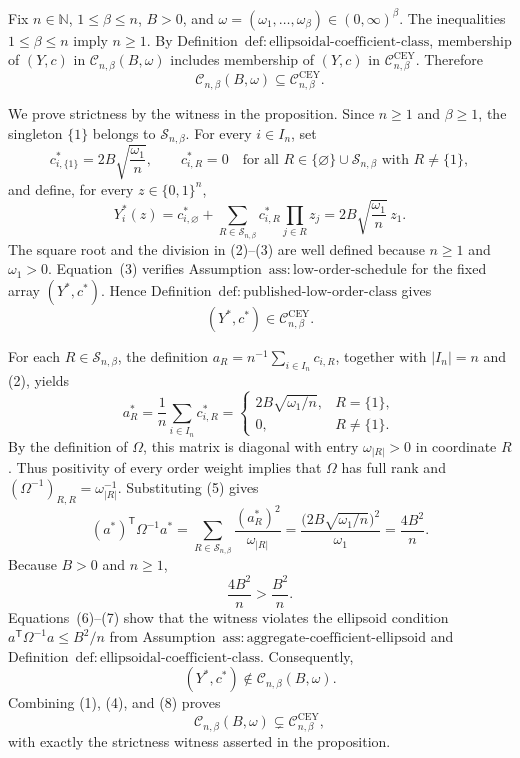 Fix \(n\in\mathbb N\), \(1\leq\beta\leq n\), \(B>0\), and
\(\omega=(\omega_1,\ldots,\omega_\beta)\in(0,\infty)^\beta\).  The inequalities
\(1\leq\beta\leq n\) imply \(n\geq1\).  By
Definition~\(\mathrm{def{:}ellipsoidal\text{-}coefficient\text{-}class}\), membership of
\((Y,c)\) in \(\mathcal C_{n,\beta}(B,\omega)\) includes membership of
\((Y,c)\) in \(\mathcal C^{\mathrm{CEY}}_{n,\beta}\).  Therefore
\[
\mathcal C_{n,\beta}(B,\omega)
\subseteq \mathcal C^{\mathrm{CEY}}_{n,\beta}.
\tag{1}
\]

We prove strictness by the witness in the proposition.  Since \(n\geq1\) and
\(\beta\geq1\), the singleton \(\{1\}\) belongs to
\(\mathcal S_{n,\beta}\).  For every \(i\in I_n\), set
\[
c^*_{i,\{1\}}=2B\sqrt{\frac{\omega_1}{n}},
\qquad
c^*_{i,R}=0
\quad
\text{for all }R\in\{\varnothing\}\cup\mathcal S_{n,\beta}
\text{ with }R\neq\{1\},
\tag{2}
\]
and define, for every \(z\in\{0,1\}^n\),
\[
Y_i^*(z)
=c^*_{i,\varnothing}
+\sum_{R\in\mathcal S_{n,\beta}}c^*_{i,R}
  \prod_{j\in R}z_j
=2B\sqrt{\frac{\omega_1}{n}}\,z_1.
\tag{3}
\]
The square root and the division in (2)--(3) are well defined because
\(n\geq1\) and \(\omega_1>0\).  Equation~(3) verifies
Assumption~\(\mathrm{ass{:}low\text{-}order\text{-}schedule}\) for the fixed array
\((Y^*,c^*)\).  Hence Definition~\(\mathrm{def{:}published\text{-}low\text{-}order\text{-}class}\)
gives
\[
(Y^*,c^*)\in\mathcal C^{\mathrm{CEY}}_{n,\beta}.
\tag{4}
\]

For each \(R\in\mathcal S_{n,\beta}\), the definition
\(a_R=n^{-1}\sum_{i\in I_n}c_{i,R}\), together with
\(|I_n|=n\) and (2), yields
\[
a_R^*
=\frac1n\sum_{i\in I_n}c^*_{i,R}
=
\begin{cases}
2B\sqrt{\omega_1/n},&R=\{1\},\\
0,&R\neq\{1\}.
\end{cases}
\tag{5}
\]
By the definition of \(\Omega\), this matrix is diagonal with entry
\(\omega_{|R|}>0\) in coordinate \(R\).  Thus positivity of every order weight
implies that \(\Omega\) has full rank and
\((\Omega^{-1})_{R,R}=\omega_{|R|}^{-1}\).  Substituting (5) gives
\[
(a^*)^{\mathsf T}\Omega^{-1}a^*
=\sum_{R\in\mathcal S_{n,\beta}}
  \frac{(a_R^*)^2}{\omega_{|R|}}
=\frac{\bigl(2B\sqrt{\omega_1/n}\bigr)^2}{\omega_1}
=\frac{4B^2}{n}.
\tag{6}
\]
Because \(B>0\) and \(n\geq1\),
\[
\frac{4B^2}{n}>\frac{B^2}{n}.
\tag{7}
\]
Equations~(6)--(7) show that the witness violates the ellipsoid condition
\(a^{\mathsf T}\Omega^{-1}a\leq B^2/n\) from
Assumption~\(\mathrm{ass{:}aggregate\text{-}coefficient\text{-}ellipsoid}\) and
Definition~\(\mathrm{def{:}ellipsoidal\text{-}coefficient\text{-}class}\).  Consequently,
\[
(Y^*,c^*)\notin\mathcal C_{n,\beta}(B,\omega).
\tag{8}
\]
Combining (1), (4), and (8) proves
\[
\mathcal C_{n,\beta}(B,\omega)
\subsetneq\mathcal C^{\mathrm{CEY}}_{n,\beta},
\]
with exactly the strictness witness asserted in the proposition.